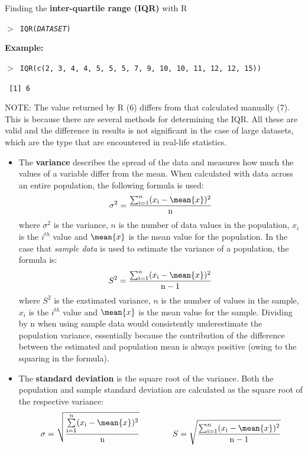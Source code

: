 \begin{howto}{Finding the \textbf{inter-quartile range (IQR)} with R}{
    \texttt{$>$ IQR(\emph{DATASET})}
    
    \textbf{\color{darkgray} Example:}

    \texttt{$>$ IQR(c(2, 3, 4, 4, 5, 5, 5, 7, 9, 10, 10, 11, 12, 12, 15))}

    \texttt{ [1] 6}

    NOTE: The value returned by R (6) differs from that calculated manually (7). This is because there are several methods for determining the IQR. All these are valid and the difference in results is not significant in the case of large datasets, which are the type that are encountered in real-life statistics.}{}{}
\end{howto}

  
\begin{itemize}
\item The \textbf{variance} describes the spread of the data and measures how much the values of a variable differ from the mean. When calculated with data across an entire population, the following formula is used:
  $$\sigma^2 = \dfrac{\sum_{\mathrm{i=1}}^{n} (x_\mathrm{i} - \mean{x})^2}{\mathrm{n}} $$
  where $\sigma^2$ is the variance, $n$ is the number of data values in the population, $x_i$ is the $i^{th}$ value and $\mean{x}$ is the mean value for the population.
  In the case that \emph{sample data} is used to estimate the variance of a population, the formula is:
  $$S^2 = \dfrac{\sum_{\mathrm{i=1}}^{n} (x_\mathrm{i} - \mean{x})^2}{\mathrm{n-1}} $$
  where $S^2$ is the exstimated variance, $n$ is the number of values in the sample, $x_i$ is the $i^{th}$ value and $\mean{x}$ is the mean value for the sample. Dividing by n when using sample data would consistently underestimate the population variance, essentially because the contribution of the difference between the estimated and population mean is always positive (owing to the squaring in the formula).
\item The \textbf{standard deviation} is the square root of the variance. Both the population and sample standard deviation are calculated as the square root of the respective variance:
$$\sigma = \sqrt{\dfrac{\sum\limits_{\mathrm{i=1}}^{n} (x_\mathrm{i} - \mean{x})^2}{\mathrm{n}}} \quad\quad\quad\quad S = \sqrt{\dfrac{\sum_{\mathrm{i=1}}^{n} (x_\mathrm{i} - \mean{x})^2}{\mathrm{n-1}}} $$
\newpage 
\end{itemize}



